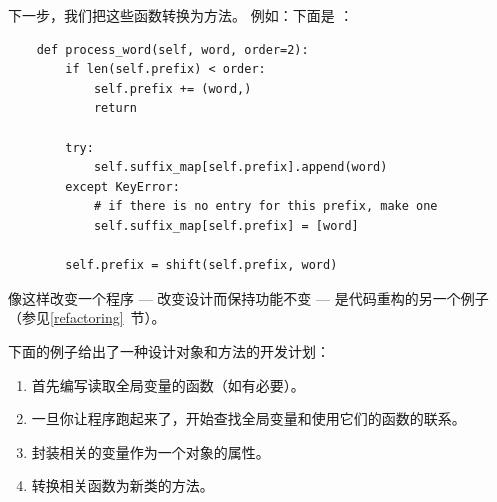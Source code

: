 
下一步，我们把这些函数转换为方法。  
例如：下面是  ：

\begin{lstlisting}
    def process_word(self, word, order=2):
        if len(self.prefix) < order:
            self.prefix += (word,)
            return

        try:
            self.suffix_map[self.prefix].append(word)
        except KeyError:
            # if there is no entry for this prefix, make one
            self.suffix_map[self.prefix] = [word]

        self.prefix = shift(self.prefix, word)
\end{lstlisting}


像这样改变一个程序 --- 改变设计而保持功能不变 --- 是代码重构的另一个例子
（参见\ref{refactoring}~节）。



下面的例子给出了一种设计对象和方法的开发计划：

\begin{enumerate}


\item 首先编写读取全局变量的函数（如有必要）。

\item 一旦你让程序跑起来了，开始查找全局变量和使用它们的函数的联系。

\item 封装相关的变量作为一个对象的属性。

\item 转换相关函数为新类的方法。

\end{enumerate}

